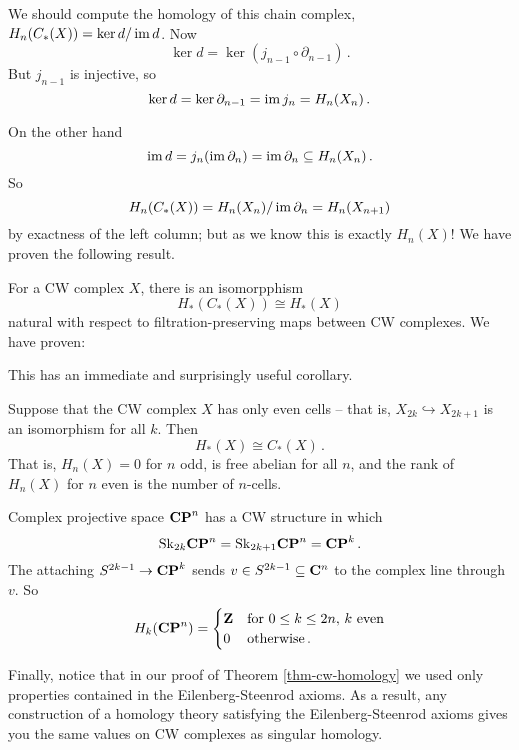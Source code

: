 We should compute the homology of this chain complex, $ H_n(C_\ast(X))=\ker d/\operatorname{im} d$. Now
\[
\ker d=\ker (j_{n-1}\circ\partial_{n-1})\,.
\]
But $j_{n-1}$ is injective, so 
\[
\ker d=\ker\partial_{n-1}=\operatorname{im} j_n=H_n(X_n)\,.
\]

On the other hand 
\[
\operatorname{im} d=j_n(\operatorname{im}\partial_n)=\operatorname{im}\partial_n\subseteq H_n(X_n)\,.
\]
So 
\[
H_n(C_*(X))=H_n(X_n)/\operatorname{im}\partial_n=H_n(X_{n+1})
\]
by exactness of the left column; but as we know this is exactly $H_n(X)$!
We have proven the following result.
\begin{theorem} \label{thm-cw-homology}
For a CW complex $X$, there is an isomorpphism
\[
H_\ast(C_\ast(X))\cong H_\ast(X)
\]
natural with respect to filtration-preserving maps between CW complexes.
We have proven:
\end{theorem}
This has an immediate and surprisingly useful corollary.
\begin{corollary}
Suppose that the CW complex $X$ has only even cells -- that is, 
$X_{2k}\hookrightarrow X_{2k+1}$ is an isomorphism for all $k$.
Then 
\[
H_*(X)\cong C_*(X)\,.
\]
That is, $H_n(X)=0$ for $n$ odd, is free abelian for all $n$, 
and the rank of $H_n(X)$ for $n$ even is the number of $n$-cells. 
\end{corollary}
\begin{example}
Complex projective space $\mathbf{CP}^n$ has a CW structure in which 
\[
\mathrm{Sk}_{2k}\mathbf{CP}^n=\mathrm{Sk}_{2k+1}\mathbf{CP}^n=\mathbf{CP}^k\,.
\] 
The attaching $S^{2k-1}\to\mathbf{CP}^k$
sends $v\in S^{2k-1}\subseteq\mathbf C^n$ to the complex line through $v$. So 
\[
H_k(\mathbf{CP}^n)=\begin{cases}\mathbf Z & \hbox{for}\,\,0\leq k\leq 2n,\, k\,\,\hbox{even}\\
0 & \hbox{otherwise}
\,.\end{cases}
\]
\end{example}

Finally, notice that in our proof of Theorem \ref{thm-cw-homology} we used only properties contained in the Eilenberg-Steenrod axioms. As a result,
any construction of a homology theory satisfying the Eilenberg-Steenrod axioms gives you the same values on CW complexes as singular homology. 
